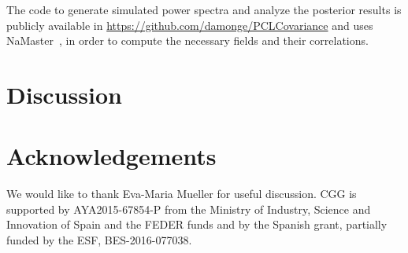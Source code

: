 \documentclass[useAMS,usenatbib]{mn2e}
\begin{document}
The code to generate simulated power spectra and analyze the posterior
results is publicly available in
\url{https://github.com/damonge/PCLCovariance} and uses
NaMaster~\cite{2018arXiv180909603A}, in order to compute the necessary fields
and their correlations. 


\section{Discussion}\label{sec:discussion}


\section*{Acknowledgements}
We would like to thank Eva-Maria Mueller for useful discussion. CGG is
supported by AYA2015-67854-P from the Ministry of Industry, Science and
Innovation of Spain and the FEDER funds and by the Spanish grant, partially
funded by the ESF, BES-2016-077038.

\setlength{\bibhang}{2.0em}
\setlength{}

\end{document}
